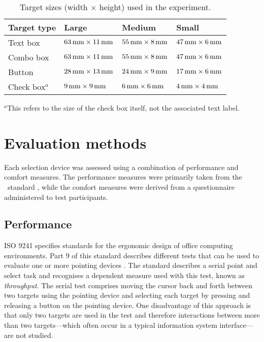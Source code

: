 \documentclass{elsart}
\begin{document}
\begin{table}[ht]
	\caption{Target sizes (width \(\times\) height) used in the experiment.}
	\label{tab-target-sizes}
	\begin{tabular}{llll}
		\hline
		\textbf{Target type}	&	\textbf{Large}							&	\textbf{Medium}							&	\textbf{Small}	\\
		\hline
		Text box				&	\(\unit[63]{mm} \times \unit[11]{mm}\)	&	\(\unit[55]{mm} \times \unit[8]{mm}\)	&	\(\unit[47]{mm} \times \unit[6]{mm}\)	\\
		Combo box				&	\(\unit[63]{mm} \times \unit[11]{mm}\)	&	\(\unit[55]{mm} \times \unit[8]{mm}\)	&	\(\unit[47]{mm} \times \unit[6]{mm}\)	\\
		Button					&	\(\unit[28]{mm} \times \unit[13]{mm}\)	&	\(\unit[24]{mm} \times \unit[9]{mm}\)	&	\(\unit[17]{mm} \times \unit[6]{mm}\)	\\
		Check box\(^{a}\)		&	\(\unit[9]{mm} \times \unit[9]{mm}\)	&	\(\unit[6]{mm} \times \unit[6]{mm}\)	&	\(\unit[4]{mm} \times \unit[4]{mm}\)	\\
		\hline
	\end{tabular}
	
	{\footnotesize \(^{a}\)This refers to the size of the check box itself, not the associated text label.}
\end{table}


\section{Evaluation methods}
\label{sec-evaluation}

Each selection device was assessed using a combination of performance
and comfort measures. The performance measures were primarily taken from
the \ISOnine\ standard \citep{ISO-2000-9241-9}, while the comfort
measures were derived from a questionnaire administered to test
participants.


\subsection{Performance}
\label{sec-evaluation-performance}

ISO 9241 specifies standards for the ergonomic design of office
computing environments. Part 9 of this standard describes different
tests that can be used to evaluate one or more pointing devices
\citep{ISO-2000-9241-9}. The standard describes a serial point and
select task and recognises a dependent measure used with this test,
known as \emph{throughput}. The serial test comprises moving the cursor
back and forth between two targets using the pointing device and
selecting each target by pressing and releasing a button on the pointing
device. One disadvantage of this approach is that only two targets are
used in the test and therefore interactions between more than two
targets---which often occur in a typical information system
interface---are not studied.
\end{document}
